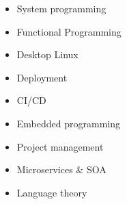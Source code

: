 \documentclass[a4paper]{report}
\begin{document}
\begin{multicols}{3}
    \centering
    \begin{itemize}[leftmargin=2em, topsep=-.5em, parsep=0em]
        \item System programming
        \item Functional Programming
        \item Desktop Linux
        \item Deployment
        \item CI/CD
        \item Embedded programming
        \item Project management
        \item Microservices \& SOA
        \item Language theory
    \end{itemize}
\end{multicols}

\newcommand{\p}[1]{\textbf{#1}\mbox{}\newline}
\def\n{\\}
\end{document}
